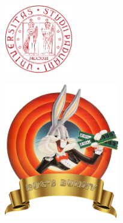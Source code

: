 \begin{titlepage}
    \begin{center}
        \makeatletter
        \vspace*{\fill}
        
        
        \begin{minipage}[]{0.3\textwidth}
            \centering
            \includegraphics[width=3cm]{assets/unipd}
            \bigskip
        \end{minipage}
        \begin{minipage}[]{0.7\textwidth}
            \centering
                \vspace*{2cm}
        \end{minipage}
        

        \includegraphics[width=5cm]{assets/logo}

        \Huge
        \textbf{\teamname}
        
        \vspace{3cm}
        

\end{center}
\end{titlepage}
